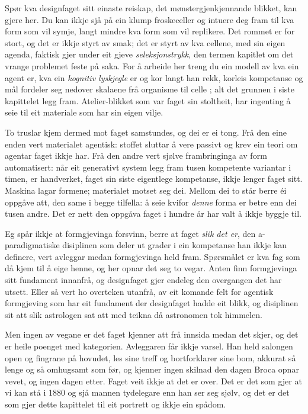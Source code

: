 Spør kva designfaget sitt einaste reiskap, det mønstergjenkjennande blikket, kan gjere her. Du kan ikkje sjå på ein klump froskeceller og intuere deg fram til kva form som vil symje, langt mindre kva form som vil replikere. Det rommet er for stort, og det er ikkje styrt av smak; det er styrt av kva cellene, med sin eigen agenda, faktisk gjer under eit gjeve \emph{seleksjonstrykk}, den termen kapitlet om det vrange problemet feste på saka. For å arbeide her treng du ein modell av kva ein agent er, kva ein \emph{kognitiv lyskjegle} er og kor langt han rekk, korleis kompetanse og mål fordeler seg nedover skalaene frå organisme til celle \autocite{levin2022,fields2022}; alt det grunnen i siste kapittelet legg fram. Atelier-blikket som var faget sin stoltheit, har ingenting å seie til eit materiale som har sin eigen vilje.

To truslar kjem dermed mot faget samstundes, og dei er ei tong. Frå den eine enden vert materialet agentisk: stoffet sluttar å vere passivt og krev ein teori om agentar faget ikkje har. Frå den andre vert sjølve frambringinga av form automatisert: når eit generativt system legg fram tusen kompetente variantar i timen, er handverket, faget sin siste eigentlege kompetanse, ikkje lenger faget sitt. Maskina lagar formene; materialet motset seg dei. Mellom dei to står berre éi oppgåve att, den same i begge tilfella: å seie kvifor \emph{denne} forma er betre enn dei tusen andre. Det er nett den oppgåva faget i hundre år har valt å ikkje byggje til.

Eg spår ikkje at formgjevinga forsvinn, berre at faget \emph{slik det er}, den a-paradigmatiske disiplinen som deler ut grader i ein kompetanse han ikkje kan definere, vert avleggar medan formgjevinga held fram. Spørsmålet er kva fag som då kjem til å eige henne, og her opnar det seg to vegar. Anten finn formgjevinga sitt fundament innanfrå, og designfaget gjer endeleg den overgangen det har utsett. Eller så vert ho overteken utanfrå, av eit komande felt for agentisk formgjeving som har eit fundament der designfaget hadde eit blikk, og disiplinen sit att slik astrologen sat att med teikna då astronomen tok himmelen.

Men ingen av vegane er det faget kjenner att frå innsida medan det skjer, og det er heile poenget med kategorien. Avleggaren får ikkje varsel. Han held salongen open og fingrane på hovudet, les sine treff og bortforklarer sine bom, akkurat så lenge og så omhugsamt som før, og kjenner ingen skilnad den dagen Broca opnar vevet, og ingen dagen etter. Faget veit ikkje at det er over. Det er det som gjer at vi kan stå i 1880 og sjå mannen tydelegare enn han ser seg sjølv, og det er det som gjer dette kapittelet til eit portrett og ikkje ein spådom.


